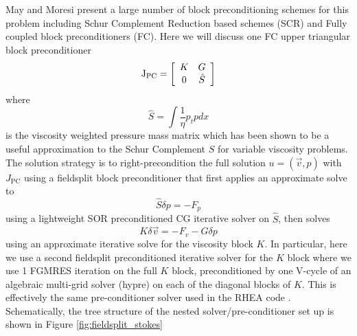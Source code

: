 May and Moresi \cite{may_preconditioned_2008} present a large number of block
preconditioning schemes for this problem including Schur Complement
Reduction based schemes (SCR) and Fully coupled block preconditioners
(FC).  Here we will discuss one FC upper triangular block
preconditioner
\begin{equation}
  \label{eq:ch3-22}
    \mathrm{J}_{\text{PC}} =   \left[
\begin{array}{cc}
  K & G  \\
  0 & \hat{S} \\
  \end{array}
  \right]
\end{equation}
where
\begin{displaymath}
  \hat{S} = \int \frac{1}{\eta} p_{t}p dx
\end{displaymath}
is the viscosity weighted pressure mass matrix which has been shown to
be a useful approximation to the Schur Complement $S$ for variable
viscosity problems\cite{grinevich_iterative_2009,ur_rehman_iterative_2011}.  The solution
strategy is to right-precondition the full solution $u=(\vec{v},p)$
with $J_{\text{PC}}$ using a fieldsplit block preconditioner that
first applies an approximate solve to
\begin{equation}
  \hat{S}\delta p = -F_{p}
\label{eq:ch3-23}
\end{equation}
using a lightweight SOR preconditioned CG iterative solver on
$\hat{S}$, then solves
\begin{equation}
  K\delta\vec{v} = -F_{v} - G\delta p
\label{eq:ch3-24}
\end{equation}
using an approximate iterative solve for the viscosity block $K$. In
particular, here we use a second fieldsplit preconditioned iterative
solver for the $K$ block where we use 1 FGMRES iteration on the full
$K$ block, preconditioned by one V-cycle of  an algebraic multi-grid
solver (hypre) on each of the diagonal blocks of $K$. This is
effectively the same pre-conditioner solver used in the RHEA code
\cite{burstedde_large-scale_2013}. Schematically, the tree structure of the nested solver/pre-conditioner set up is shown in
Figure \ref{fig:fieldsplit_stokes}
